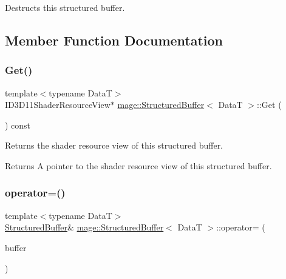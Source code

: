 Destructs this structured buffer. 

\subsection{Member Function Documentation}
\hypertarget{structmage_1_1_structured_buffer_ad933738bc55b10aea665913a8215bab0}{}\label{structmage_1_1_structured_buffer_ad933738bc55b10aea665913a8215bab0} 
\subsubsection{\texorpdfstring{Get()}{Get()}}
{\footnotesize\ttfamily template$<$typename DataT$>$ \\
I\+D3\+D11\+Shader\+Resource\+View$\ast$ \hyperlink{structmage_1_1_structured_buffer}{mage\+::\+Structured\+Buffer}$<$ DataT $>$\+::Get (\begin{DoxyParamCaption}{ }\end{DoxyParamCaption}) const\hspace{0.3cm}{\ttfamily [noexcept]}}

Returns the shader resource view of this structured buffer.

\begin{DoxyReturn}{Returns}
A pointer to the shader resource view of this structured buffer. 
\end{DoxyReturn}
\hypertarget{structmage_1_1_structured_buffer_ac00255155ab1eb61244392adcf262d40}{}\label{structmage_1_1_structured_buffer_ac00255155ab1eb61244392adcf262d40} 
\subsubsection{\texorpdfstring{operator=()}{operator=()}\hspace{0.1cm}{\footnotesize\ttfamily [1/2]}}
{\footnotesize\ttfamily template$<$typename DataT$>$ \\
\hyperlink{structmage_1_1_structured_buffer}{Structured\+Buffer}\& \hyperlink{structmage_1_1_structured_buffer}{mage\+::\+Structured\+Buffer}$<$ DataT $>$\+::operator= (\begin{DoxyParamCaption}\item[{const \hyperlink{structmage_1_1_structured_buffer}{Structured\+Buffer}$<$ DataT $>$ \&}]{buffer }\end{DoxyParamCaption})\hspace{0.3cm}{\ttfamily [delete]}}

